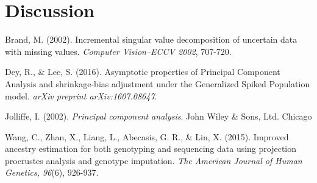\documentclass{article}[12pt]
\begin{document}
\section{Discussion}

\newpage

\begin{thebibliography}{}
 
 Brand, M. (2002). Incremental singular value decomposition of uncertain data with missing values. {\it Computer Vision--ECCV 2002}, 707-720.

 Dey, R., \& Lee, S. (2016). Asymptotic properties of Principal Component Analysis and shrinkage-bias adjustment under the Generalized Spiked Population model. {\it arXiv preprint arXiv:1607.08647}.
  
 Jolliffe, I. (2002). {\it Principal component analysis}. John Wiley \& Sons, Ltd.
Chicago	


  Wang, C., Zhan, X., Liang, L., Abecasis, G. R., \& Lin, X. (2015). Improved ancestry estimation for both genotyping and sequencing data using projection procrustes analysis and genotype imputation. {\it The American Journal of Human Genetics, 96}(6), 926-937.

\end{thebibliography}


\end{document}
